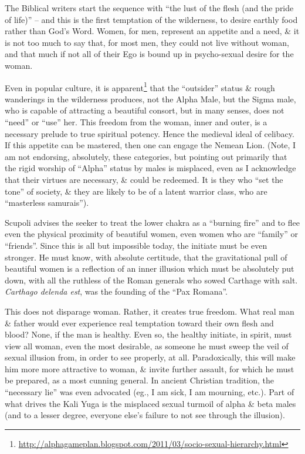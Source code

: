 The Biblical writers start the sequence with ``the lust of the flesh (and the pride of life)'' -- and this is the first temptation of the wilderness, to desire earthly food rather than God's Word. Women, for men, represent an appetite and a need, \& it is not too much to say that, for most men, they could not live without woman, and that much if not all of their Ego is bound up in psycho-sexual desire for the woman.

Even in popular culture, it is apparent\footnote{\url{http://alphagameplan.blogspot.com/2011/03/socio-sexual-hierarchy.html}} that the ``outsider'' status \& rough wanderings in the wilderness produces, not the Alpha Male, but the Sigma male, who is capable of attracting a beautiful consort, but in many senses, does not ``need'' or ``use'' her. This freedom from the woman, inner and outer, is a necessary prelude to true spiritual potency. Hence the medieval ideal of celibacy. If this appetite can be mastered, then one can engage the Nemean Lion. (Note, I am not endorsing, absolutely, these categories, but pointing out primarily that the rigid worship of ``Alpha'' status by males is misplaced, even as I acknowledge that their virtues are necessary, \& could be redeemed. It is they who ``set the tone'' of society, \& they are likely to be of a latent warrior class, who are ``masterless samurais'').

Scupoli advises the seeker to treat the lower chakra as a ``burning fire'' and to flee even the physical proximity of beautiful women, even women who are ``family'' or ``friends''. Since this is all but impossible today, the initiate must be even stronger. He must know, with absolute certitude, that the gravitational pull of beautiful women is a reflection of an inner illusion which must be absolutely put down, with all the ruthless of the Roman generals who sowed Carthage with salt.
\emph{Carthago delenda est}, was the founding of the ``Pax Romana''.


This does not disparage woman. Rather, it creates true freedom. What real man \& father would ever experience real temptation toward their own flesh and blood? None, if the man is healthy. Even so, the healthy initiate, in spirit, must view all woman, even the most desirable, as someone he must sweep the veil of sexual illusion from, in order to see properly, at all. Paradoxically, this will make him more more attractive to woman, \& invite further assault, for which he must be prepared, as a most cunning general. In ancient Christian tradition, the ``necessary lie'' was even advocated (eg., I am sick, I am mourning, etc.). Part of what drives the Kali Yuga is the misplaced sexual turmoil of alpha \& beta males (and to a lesser degree, everyone else's failure to not see through the illusion).

